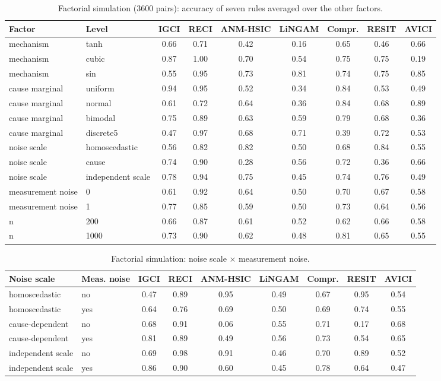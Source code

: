 \begin{table}[t]
\caption{Factorial simulation (3600 pairs): accuracy of seven rules averaged over the other factors.}
\label{tab:factorial}
\small
\setlength{\tabcolsep}{3pt}
\begin{tabular}{@{}llccccccc@{}}
\toprule
Factor & Level & IGCI & RECI & ANM-HSIC & LiNGAM & Compr. & RESIT & AVICI\\
\midrule
mechanism & tanh & 0.66 & 0.71 & 0.42 & 0.16 & 0.65 & 0.46 & 0.66\\
mechanism & cubic & 0.87 & 1.00 & 0.70 & 0.54 & 0.75 & 0.75 & 0.19\\
mechanism & sin & 0.55 & 0.95 & 0.73 & 0.81 & 0.74 & 0.75 & 0.85\\
cause marginal & uniform & 0.94 & 0.95 & 0.52 & 0.34 & 0.84 & 0.53 & 0.49\\
cause marginal & normal & 0.61 & 0.72 & 0.64 & 0.36 & 0.84 & 0.68 & 0.89\\
cause marginal & bimodal & 0.75 & 0.89 & 0.63 & 0.59 & 0.79 & 0.68 & 0.36\\
cause marginal & discrete5 & 0.47 & 0.97 & 0.68 & 0.71 & 0.39 & 0.72 & 0.53\\
noise scale & homoscedastic & 0.56 & 0.82 & 0.82 & 0.50 & 0.68 & 0.84 & 0.55\\
noise scale & cause & 0.74 & 0.90 & 0.28 & 0.56 & 0.72 & 0.36 & 0.66\\
noise scale & independent scale & 0.78 & 0.94 & 0.75 & 0.45 & 0.74 & 0.76 & 0.49\\
measurement noise & 0 & 0.61 & 0.92 & 0.64 & 0.50 & 0.70 & 0.67 & 0.58\\
measurement noise & 1 & 0.77 & 0.85 & 0.59 & 0.50 & 0.73 & 0.64 & 0.56\\
n & 200 & 0.66 & 0.87 & 0.61 & 0.52 & 0.62 & 0.66 & 0.58\\
n & 1000 & 0.73 & 0.90 & 0.62 & 0.48 & 0.81 & 0.65 & 0.55\\
\bottomrule
\end{tabular}
\end{table}

\begin{table}[t]
\caption{Factorial simulation: noise scale $\times$ measurement noise.}
\label{tab:factorial2}
\small
\setlength{\tabcolsep}{3pt}
\begin{tabular}{@{}llccccccc@{}}
\toprule
Noise scale & Meas. noise & IGCI & RECI & ANM-HSIC & LiNGAM & Compr. & RESIT & AVICI\\
\midrule
homoscedastic & no & 0.47 & 0.89 & 0.95 & 0.49 & 0.67 & 0.95 & 0.54\\
homoscedastic & yes & 0.64 & 0.76 & 0.69 & 0.50 & 0.69 & 0.74 & 0.55\\
cause-dependent & no & 0.68 & 0.91 & 0.06 & 0.55 & 0.71 & 0.17 & 0.68\\
cause-dependent & yes & 0.81 & 0.89 & 0.49 & 0.56 & 0.73 & 0.54 & 0.65\\
independent scale & no & 0.69 & 0.98 & 0.91 & 0.46 & 0.70 & 0.89 & 0.52\\
independent scale & yes & 0.86 & 0.90 & 0.60 & 0.45 & 0.78 & 0.64 & 0.47\\
\bottomrule
\end{tabular}
\end{table}

